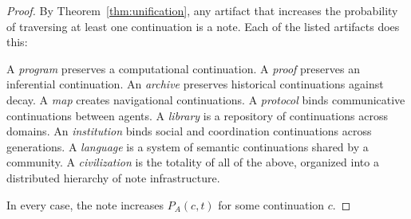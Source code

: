 \documentclass[12pt, a4paper, openany]{book}
\theoremstyle{plain}
\theoremstyle{definition}
\theoremstyle{remark}
\begin{document}
\begin{proof}
By Theorem~\ref{thm:unification}, any artifact that increases the probability of
traversing at least one continuation is a note. Each of the listed artifacts does
this:

A \emph{program} preserves a computational continuation.
A \emph{proof} preserves an inferential continuation.
An \emph{archive} preserves historical continuations against decay.
A \emph{map} creates navigational continuations.
A \emph{protocol} binds communicative continuations between agents.
A \emph{library} is a repository of continuations across domains.
An \emph{institution} binds social and coordination continuations across
generations.
A \emph{language} is a system of semantic continuations shared by a community.
A \emph{civilization} is the totality of all of the above, organized into a
distributed hierarchy of note infrastructure.

In every case, the note increases $P_A(c, t)$ for some continuation $c$.
\end{proof}
\end{document}
